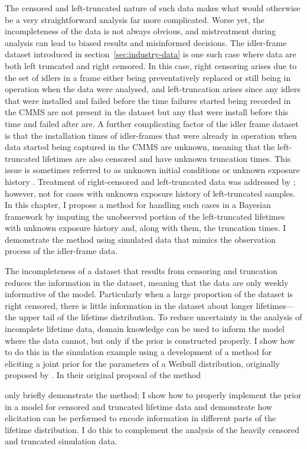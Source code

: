The censored and left-truncated nature of such data makes what would otherwise be a very straightforward analysis far more complicated. Worse yet, the incompleteness of the data is not always obvious, and mistreatment during analysis can lead to biased results and misinformed decisions. The idler-frame dataset introduced in section~\ref{sec:industry-data} is one such case where data are both left truncated and right censored. In this case, right censoring arises due to the set of idlers in a frame either being preventatively replaced or still being in operation when the data were analysed, and left-truncation arises since any idlers that were installed and failed before the time failures started being recorded in the CMMS are not present in the dataset but any that were install before this time and failed after are. A further complicating factor of the idler frame dataset is that the installation times of idler-frames that were already in operation when data started being captured in the CMMS are unknown, meaning that the left-truncated lifetimes are also censored and have unknown truncation times. This issue is sometimes referred to as unknown initial conditions or unknown exposure history \citep{guo1993}. Treatment of right-censored and left-truncated data was addressed by \citet{hong2009}; however, not for cases with unknown exposure history of left-truncated samples. In this chapter, I propose a method for handling such cases in a Bayesian framework by imputing the unobserved portion of the left-truncated lifetimes with unknown exposure history and, along with them, the truncation times. I demonstrate the method using simulated data that mimics the observation process of the idler-frame data.

The incompleteness of a dataset that results from censoring and truncation reduces the information in the dataset, meaning that the data are only weekly informative of the model. Particularly when a large proportion of the dataset is right censored, there is little information in the dataset about longer lifetimes---the upper tail of the lifetime distribution. To reduce uncertainty in the analysis of incomplete lifetime data, domain knowledge can be used to inform the model where the data cannot, but only if the prior is constructed properly. 
I show how to do this in the simulation example using a development of a method for eliciting a joint prior for the parameters of a Weibull distribution, originally proposed by \citet{kaminskiy2005}. In their original proposal of the method \author{kaminskiy2005} only briefly demonstrate the method; I show how to properly implement the prior in a model for censored and truncated lifetime data and demonstrate how elicitation can be performed to encode information in different parts of the lifetime distribution. I do this to complement the analysis of the heavily censored and truncated simulation data.

